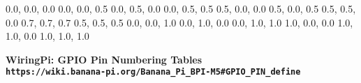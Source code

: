 \documentclass[11pt,a4paper]{article}
\begin{document}
\begin{sffamily}
\definecolor{rtb-black}{rgb}  {0.0, 0.0, 0.0}
\definecolor{rtb-navy}{rgb}   {0.0, 0.0, 0.5}
\definecolor{rtb-green}{rgb}  {0.0, 0.5, 0.0}
\definecolor{rtb-teal}{rgb}   {0.0, 0.5, 0.5}
\definecolor{rtb-maroon}{rgb} {0.5, 0.0, 0.0}
\definecolor{rtb-purple}{rgb} {0.5, 0.0, 0.5}
\definecolor{rtb-olive}{rgb}  {0.5, 0.5, 0.0}
\definecolor{rtb-silver}{rgb} {0.7, 0.7, 0.7}
\definecolor{rtb-grey}{rgb}   {0.5, 0.5, 0.5}
\definecolor{rtb-blue}{rgb}   {0.0, 0.0, 1.0}
\definecolor{rtb-lime}{rgb}   {0.0, 1.0, 0.0}
\definecolor{rtb-aqua}{rgb}   {0.0, 1.0, 1.0}
\definecolor{rtb-red}{rgb}    {1.0, 0.0, 0.0}
\definecolor{rtb-yellow}{rgb} {1.0, 1.0, 0.0}
\definecolor{rtb-white}{rgb}  {1.0, 1.0, 1.0}

\begin{center}
\bfseries{WiringPi: GPIO Pin Numbering Tables}\\
\tt{https://wiki.banana-pi.org/Banana_Pi_BPI-M5#GPIO_PIN_define}
\end{center}


\end{sffamily}
\end{document}
